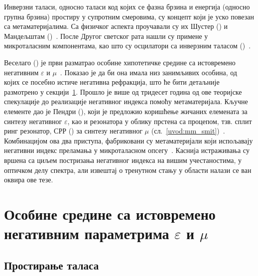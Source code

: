 \documentclass[main.tex]{subfiles}
\begin{document}
Инверзни таласи, односно таласи код којих се фазна брзина и енергија (односно групна брзина) простиру у супротним смеровима, су концепт који је уско повезан са метаматеријалима. Са физичког аспекта проучавали су их Шустер () и Мандељштам ()~\cite{Sham:09}. После Другог светског рата нашли су примене у микроталасним компонентама, као што су осцилатори са инверзним таласом ()~\cite{hutter1965beam}.

Веселаго () је први разматрао особине хипотетичке средине са истовремено негативним $\varepsilon$ и $\mu$~\cite{veselago_cir}. Показао је да би она имала низ занимљивих особина, од којих се посебно истиче негативна рефракција, што ће бити детаљније размотрено у секцији~\ref{sec:osobine}. Прошло је више од тридесет година од ове теоријске спекулације до реализације негативног индекса помоћу метаматеријала. Кључне елементе дао је Пендри (), који је предложио коришћење жичаних елемената за синтезу негативног $\varepsilon$, као и резонатора у облику прстена са процепом, тзв. сплит ринг резонатор, СРР () за синтезу негативног $\mu$ (сл.~\ref{uvod:mm_smit})~\cite{pendri:99}. Комбинацијом ова два приступа, фабриковани су метаматеријали који испољавају негативни индекс преламања у микроталасном опсегу~\cite{smith:00}. Каснија истраживања су вршена са циљем постризања негативног индекса на вишим учестаностима, у оптичком делу спектра, али извештај о тренутном стању у области налази се ван оквира ове тезе.
%

\section{Особине средине са истовремено негативним параметрима $\varepsilon$ и $\mu$}
\label{sec:osobine}
\subsection{Простирање таласа}
\end{document}
